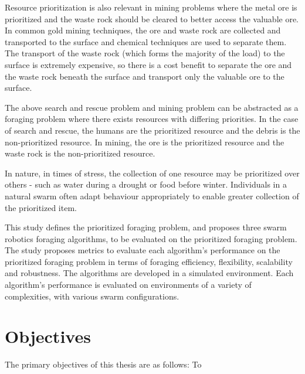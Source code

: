 Resource prioritization is also relevant in mining problems where the metal ore is prioritized and the waste rock should be cleared to better access the valuable ore. In common gold mining techniques, the ore and waste rock are collected and transported to the surface and chemical techniques are used to separate them. The transport of the waste rock (which forms the majority of the load) to the surface is extremely expensive, so there is a cost benefit to separate the ore and the waste rock beneath the surface and transport only the valuable ore to the surface.

The above search and rescue problem and mining problem can be abstracted as a foraging problem where there exists resources with differing priorities. In the case of search and rescue, the humans are the prioritized resource and the debris is the non-prioritized resource. In mining, the ore is the prioritized resource and the waste rock is the non-prioritized resource. 

In nature, in times of stress, the collection of one resource may be prioritized over others - such as water during a drought or food before winter. Individuals in a natural swarm often adapt behaviour appropriately to enable greater collection of the prioritized item.

This study defines the prioritized foraging problem, and proposes three swarm robotics foraging algorithms, to be evaluated on the prioritized foraging problem. The study proposes metrics to evaluate each algorithm's performance on the prioritized foraging problem in terms of foraging efficiency, flexibility, scalability and robustness. The algorithms are developed in a simulated environment. Each algorithm's performance is evaluated on environments of a variety of complexities, with various swarm configurations.


\section{Objectives}
\label{sec:introduction:objectives}

The primary objectives of this thesis are as follows: To

